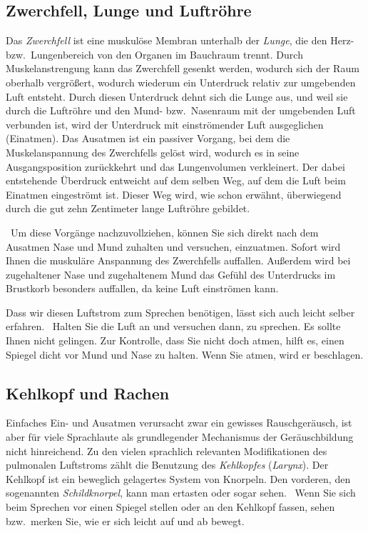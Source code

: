 \subsection{Zwerchfell, Lunge und Luftröhre}

Das \textit{Zwerchfell} ist eine muskulöse Membran unterhalb der \textit{Lunge}, die den Herz- bzw.\ Lungenbereich von den Organen im Bauchraum trennt.
Durch Muskelanstrengung kann das Zwerchfell gesenkt werden, wodurch sich der Raum oberhalb vergrößert, wodurch wiederum ein Unterdruck relativ zur umgebenden Luft entsteht.
Durch diesen Unterdruck dehnt sich die Lunge aus, und weil sie durch die Luftröhre und den Mund- bzw.\ Nasenraum mit der umgebenden Luft verbunden ist, wird der Unterdruck mit einströmender Luft ausgeglichen (Einatmen).
Das Ausatmen ist ein passiver Vorgang, bei dem die Muskelanspannung des Zwerchfells gelöst wird, wodurch es in seine Ausgangsposition zurückkehrt und das Lungenvolumen verkleinert.
Der dabei entstehende Überdruck entweicht auf dem selben Weg, auf dem die Luft beim Einatmen eingeströmt ist.
Dieser Weg wird, wie schon erwähnt, überwiegend durch die gut zehn Zentimeter lange Luftröhre gebildet.

\TuBegin~Um diese Vorgänge nachzuvollziehen, können Sie sich direkt nach dem Ausatmen Nase und Mund zuhalten und versuchen, einzuatmen.
Sofort wird Ihnen die muskuläre Anspannung des Zwerchfells auffallen.
Außerdem wird bei zugehaltener Nase und zugehaltenem Mund das Gefühl des Unterdrucks im Brustkorb besonders auffallen, da keine Luft einströmen kann.

Dass wir diesen Luftstrom zum Sprechen benötigen, lässt sich auch leicht selber erfahren.
\TuBegin~Halten Sie die Luft an und versuchen dann, zu sprechen.
Es sollte Ihnen nicht gelingen.
Zur Kontrolle, dass Sie nicht doch atmen, hilft es, einen Spiegel dicht vor Mund und Nase zu halten.
Wenn Sie atmen, wird er beschlagen.

\subsection{Kehlkopf und Rachen}

\label{sec:kehlkopfrachen}

Einfaches Ein- und Ausatmen verursacht zwar ein gewisses Rauschgeräusch, ist aber für viele Sprachlaute als grundlegender Mechanismus der Geräuschbildung nicht hinreichend.
Zu den vielen sprachlich relevanten Modifikationen des pulmonalen Luftstroms zählt die Benutzung des \textit{Kehlkopfes} (\textit{Larynx}).
Der Kehlkopf ist ein beweglich gelagertes System von Knorpeln.
Den vorderen, den sogenannten \textit{Schildknorpel}, kann man ertasten oder sogar sehen.
\TuBegin~Wenn Sie sich beim Sprechen vor einen Spiegel stellen oder an den Kehlkopf fassen, sehen bzw.\ merken Sie, wie er sich leicht auf und ab bewegt.

